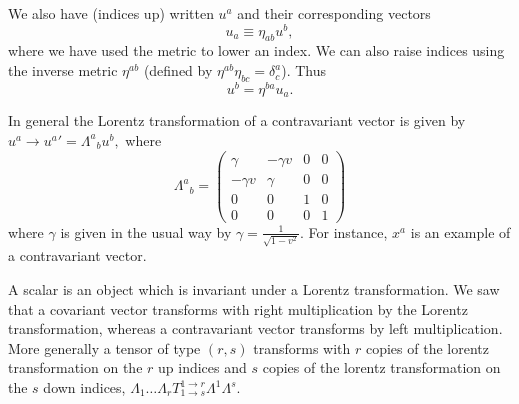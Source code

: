 \begin{defn}
We also have  (indices up) written $u^a$ and their corresponding  vectors $$u_a\equiv\eta_{ab}u^b,$$ where we have used the metric to lower an index. We can also raise indices using the inverse metric $\eta^{ab}$ (defined by $\eta^{ab}\eta_{bc}=\delta^a_c$). Thus
$$u^b=\eta^{ba}u_a.$$
\end{defn}

In general the Lorentz transformation of a contravariant vector is given by
$u^a\to {u^a}' = {\Lambda^a}_b u^b,$ where
$${\Lambda^a}_b =
\begin{pmatrix}
\gamma&-\gamma v &0 & 0\\
-\gamma v & \gamma & 0 & 0\\
0&0&1&0\\
0&0&0&1
\end{pmatrix}$$
where $\gamma$ is given in the usual way by $\gamma=\frac{1}{\sqrt{1-v^2}}$. For instance, $x^a$ is an example of a contravariant vector.

\begin{defn}
A scalar is an object which is invariant under a Lorentz transformation. We saw that a covariant vector transforms with right multiplication by the Lorentz transformation, whereas a contravariant vector transforms by left multiplication. More generally a tensor of type $(r,s)$ transforms with $r$ copies of the lorentz transformation on the $r$ up indices and $s$ copies of the lorentz transformation on the $s$ down indices, $\Lambda_1 \ldots \Lambda_r T^{1\to r}_{1\to s} \Lambda^1 \Lambda^s$.
\end{defn}